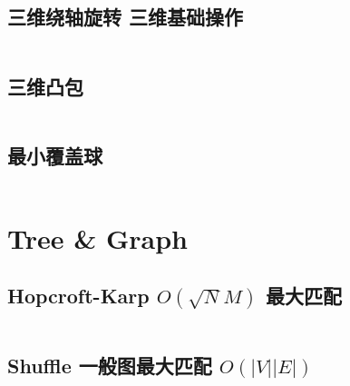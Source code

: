 \documentclass[titlepage, a4paper]{article}
\begin{document}
\begin{multicols}{2}
\begin{spacing}{0.6}
				\subsection{三维绕轴旋转 三维基础操作}
				\inputminted{cpp}{src/Geometry/三维几何.cpp}
				\subsection{三维凸包}
				\inputminted{cpp}{src/Geometry/三维凸包.cpp}
				\subsection{最小覆盖球}
				\inputminted{cpp}{src/Geometry/最小覆盖球.cpp}
				
			
				
			\section{Tree \& Graph}
				\subsection{Hopcroft-Karp $O(\sqrt{N}M)$ 最大匹配}
				\inputminted{cpp}{src/TreeandGraph/Hopcroft.cpp}
				\subsection{Shuffle 一般图最大匹配 $O(|V| |E|)$}
				\inputminted{cpp}{src/TreeandGraph/一般图最大匹配-shuffle.cpp}

\end{spacing}
\end{multicols}
\end{document}
